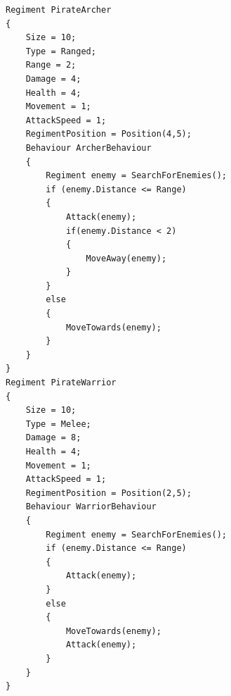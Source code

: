 \begin{lstlisting}
Regiment PirateArcher
{
	Size = 10;
	Type = Ranged;
	Range = 2;
	Damage = 4;
	Health = 4;
	Movement = 1;
	AttackSpeed = 1;
	RegimentPosition = Position(4,5);
	Behaviour ArcherBehaviour
	{
		Regiment enemy = SearchForEnemies();
		if (enemy.Distance <= Range)
		{
			Attack(enemy);
			if(enemy.Distance < 2)
			{
				MoveAway(enemy);
			}
		}
		else
		{
			MoveTowards(enemy);
		}
	}
}
Regiment PirateWarrior
{
	Size = 10;
	Type = Melee;
	Damage = 8;
	Health = 4;
	Movement = 1;
	AttackSpeed = 1;
	RegimentPosition = Position(2,5);
	Behaviour WarriorBehaviour
	{
		Regiment enemy = SearchForEnemies();
		if (enemy.Distance <= Range)
		{
			Attack(enemy);
		}
		else
		{
			MoveTowards(enemy);
			Attack(enemy);
		}
	}
}
\end{lstlisting}

